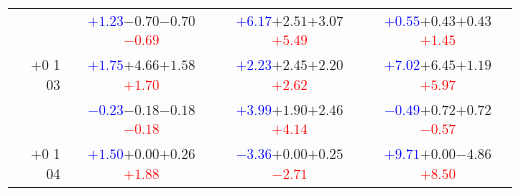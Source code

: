 \documentclass[compress]{beamer}
\begin{document}
\begin{frame}
\begin{tabular}{r | c | c | c}
          & \textcolor{blue}{$+1.23$}\hspace{0.1 cm}$-0.70$\hspace{0.1 cm}$-0.70$\hspace{0.1 cm}\textcolor{red}{$-0.69$} & \textcolor{blue}{$+6.17$}\hspace{0.1 cm}$+2.51$\hspace{0.1 cm}$+3.07$\hspace{0.1 cm}\textcolor{red}{$+5.49$} & \textcolor{blue}{$+0.55$}\hspace{0.1 cm}$+0.43$\hspace{0.1 cm}$+0.43$\hspace{0.1 cm}\textcolor{red}{$+1.45$} \\
$+$0 1 03 & \textcolor{blue}{$+1.75$}\hspace{0.1 cm}$+4.66$\hspace{0.1 cm}$+1.58$\hspace{0.1 cm}\textcolor{red}{$+1.70$} & \textcolor{blue}{$+2.23$}\hspace{0.1 cm}$+2.45$\hspace{0.1 cm}$+2.20$\hspace{0.1 cm}\textcolor{red}{$+2.62$} & \textcolor{blue}{$+7.02$}\hspace{0.1 cm}$+6.45$\hspace{0.1 cm}$+1.19$\hspace{0.1 cm}\textcolor{red}{$+5.97$} \\
          & \textcolor{blue}{$-0.23$}\hspace{0.1 cm}$-0.18$\hspace{0.1 cm}$-0.18$\hspace{0.1 cm}\textcolor{red}{$-0.18$} & \textcolor{blue}{$+3.99$}\hspace{0.1 cm}$+1.90$\hspace{0.1 cm}$+2.46$\hspace{0.1 cm}\textcolor{red}{$+4.14$} & \textcolor{blue}{$-0.49$}\hspace{0.1 cm}$+0.72$\hspace{0.1 cm}$+0.72$\hspace{0.1 cm}\textcolor{red}{$-0.57$} \\
$+$0 1 04 & \textcolor{blue}{$+1.50$}\hspace{0.1 cm}$+0.00$\hspace{0.1 cm}$+0.26$\hspace{0.1 cm}\textcolor{red}{$+1.88$} & \textcolor{blue}{$-3.36$}\hspace{0.1 cm}$+0.00$\hspace{0.1 cm}$+0.25$\hspace{0.1 cm}\textcolor{red}{$-2.71$} & \textcolor{blue}{$+9.71$}\hspace{0.1 cm}$+0.00$\hspace{0.1 cm}$-4.86$\hspace{0.1 cm}\textcolor{red}{$+8.50$} \\

\end{tabular}
\end{frame}
\end{document}
